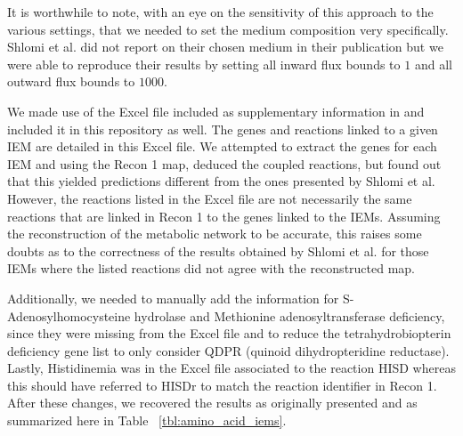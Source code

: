 \documentclass[10pt,a4paper,onecolumn]{article}
\begin{document}
It is worthwhile to note, with an eye on the sensitivity of this
approach to the various settings, that we needed to set the medium
composition very specifically. Shlomi et al. did not report on their
chosen medium in their publication but we were able to reproduce their
results by setting all inward flux bounds to \(1\) and all outward flux
bounds to \(1000\).

We made use of the Excel file included as supplementary information in
\autocite{Shlomi2009} and included it in this repository as well. The
genes and reactions linked to a given IEM are detailed in this Excel
file. We attempted to extract the genes for each IEM and using the Recon
1 map, deduced the coupled reactions, but found out that this yielded
predictions different from the ones presented by Shlomi et al. However,
the reactions listed in the Excel file are not necessarily the same
reactions that are linked in Recon 1 to the genes linked to the IEMs.
Assuming the reconstruction of the metabolic network to be accurate,
this raises some doubts as to the correctness of the results obtained by
Shlomi et al. for those IEMs where the listed reactions did not agree
with the reconstructed map.

Additionally, we needed to manually add the information for
S-Adenosylhomocysteine hydrolase and Methionine adenosyltransferase
deficiency, since they were missing from the Excel file and to reduce
the tetrahydrobiopterin deficiency gene list to only consider QDPR
(quinoid dihydropteridine reductase). Lastly, Histidinemia was in the
Excel file associated to the reaction HISD whereas this should have
referred to HISDr to match the reaction identifier in Recon 1. After
these changes, we recovered the results as originally presented and as
summarized here in Table ~\ref{tbl:amino_acid_iems}.
\end{document}
